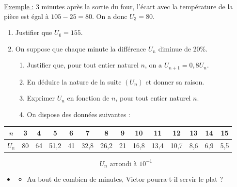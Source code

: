 \underline{Exemple :} 3 minutes après la sortie du four, l'écart avec la température de la pièce est égal à $105 - 25 = 80$. On a donc $U_3 = 80$.

\begin{enumerate}
\item Justifier que $U_0 = 155$.

\item On suppose que chaque minute la différence $U_n$ diminue de 20\%.
\begin{enumerate}
\item Justifier que, pour tout entier naturel $n$, on a $U_{n+1} = 0,8U_n$.
\item En déduire la nature de la suite $(U_n)$ et donner sa raison.
\item Exprimer $U_n$ en fonction de $n$, pour tout entier naturel $n$.
\item On dispose des données suivantes :
\end{enumerate}
\end{enumerate}

\vspace{-0.9\baselineskip}
\begin{center}
\begin{tabular}{|c|c|c|c|c|c|c|c|c|c|c|c|c|c|}
\hline
$n$ & 3 & 4 & 5 & 6 & 7 & 8 & 9 & 10 & 11 & 12 & 13 & 14 & 15 \\
\hline
$U_n$ & 80 & 64 & 51,2 & 41 & 32,8 & 26,2 & 21 & 16,8 & 13,4 & 10,7 & 8,6 & 6,9 & 5,5 \\
\hline
\end{tabular}
\end{center}

\vspace{-0.9\baselineskip}
\[U_n \text{ arrondi à } 10^{-1}\]

\vspace{-0.5\baselineskip}
\begin{itemize}
    \item[]
    \begin{itemize}
    		\item[] Au bout de combien de minutes, Victor pourra-t-il servir le plat ?
	\end{itemize}
\end{itemize}
